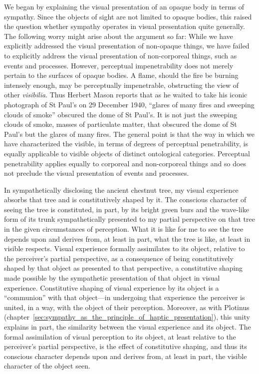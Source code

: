 We began by explaining the visual presentation of an opaque body in terms of sympathy. Since the objects of sight are not limited to opaque bodies, this raised the question whether sympathy operates in visual presentation quite generally. The following worry might arise about the argument so far: While we have explicitly addressed the visual presentation of non-opaque things, we have failed to explicitly address the visual presentation of non-corporeal things, such as events and processes. However, perceptual impenetrability does not merely pertain to the surfaces of opaque bodies. A flame, should the fire be burning intensely enough, may be perceptually impenetrable, obstructing the view of other \emph{visibilia}. Thus Herbert Mason reports that as he waited to take his iconic photograph of St Paul's on 29 December 1940, ``glares of many fires and sweeping clouds of smoke'' obscured the dome of St Paul's. It is not just the sweeping clouds of smoke, masses of particulate matter, that obscured the dome of St Paul's but the glares of many fires. The general point is that the way in which we have characterized the visible, in terms of degrees of perceptual penetrability, is equally applicable to visible objects of distinct ontological categories. Perceptual penetrability applies equally to corporeal and non-corporeal things and so does not preclude the visual presentation of events and processes.

In sympathetically disclosing the ancient chestnut tree, my visual experience absorbs that tree and is constitutively shaped by it. The conscious character of seeing the tree is constituted, in part, by its bright green burs and the wave-like form of its trunk sympathetically presented to my partial perspective on that tree in the given circumstances of perception. What it is like for me to see the tree depends upon and derives from, at least in part, what the tree is like, at least in visible respects. Visual experience formally assimilates to its object, relative to the perceiver's partial perspective, as a consequence of being constitutively shaped by that object as presented to that perspective, a constitutive shaping made possible by the sympathetic presentation of that object in visual experience. Constitutive shaping of visual experience by its object is a ``communion'' with that object---in undergoing that experience the perceiver is united, in a way, with the object of their perception. Moreover, as with Plotinus (chapter~\ref{sec:sympathy_as_the_principle_of_haptic_presentation}), this unity explains in part, the similarity between the visual experience and its object. The formal assimilation of visual perception to its object, at least relative to the perceiver's partial perspective, is the effect of constitutive shaping, and thus its conscious character depends upon and derives from, at least in part, the visible character of the object seen.

